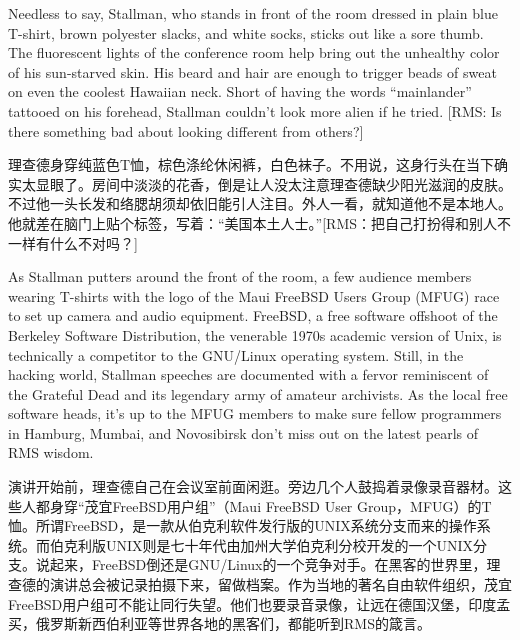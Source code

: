 \ifdefined\eng
Needless to say, Stallman, who stands in front of the room dressed in plain blue T-shirt, brown polyester slacks, and white socks, sticks out like a sore thumb. The fluorescent lights of the conference room help bring out the unhealthy color of his sun-starved skin.  His beard and hair are enough to trigger beads of sweat on even the coolest Hawaiian neck. Short of having the words ``mainlander'' tattooed on his forehead, Stallman couldn't look more alien if he tried. [RMS: Is there something bad about looking different from others?]
\fi

\ifdefined\chs
理查德身穿纯蓝色T恤，棕色涤纶休闲裤，白色袜子。不用说，这身行头在当下确实太显眼了。房间中淡淡的花香，倒是让人没太注意理查德缺少阳光滋润的皮肤。不过他一头长发和络腮胡须却依旧能引人注目。外人一看，就知道他不是本地人。他就差在脑门上贴个标签，写着：``美国本土人士。''[RMS：把自己打扮得和别人不一样有什么不对吗？]
\fi

\ifdefined\eng
As Stallman putters around the front of the room, a few audience members wearing T-shirts with the logo of the Maui FreeBSD Users Group (MFUG) race to set up camera and audio equipment. FreeBSD, a free software offshoot of the Berkeley Software Distribution, the venerable 1970s academic version of Unix, is technically a competitor to the GNU/Linux operating system. Still, in the hacking world, Stallman speeches are documented with a fervor reminiscent of the Grateful Dead and its legendary army of amateur archivists. As the local free software heads, it's up to the MFUG members to make sure fellow programmers in Hamburg, Mumbai, and Novosibirsk don't miss out on the latest pearls of RMS wisdom.
\fi

\ifdefined\chs
演讲开始前，理查德自己在会议室前面闲逛。旁边几个人鼓捣着录像录音器材。这些人都身穿``茂宜FreeBSD用户组''（Maui FreeBSD User Group，MFUG）的T恤。所谓FreeBSD，是一款从伯克利软件发行版的UNIX系统分支而来的操作系统。而伯克利版UNIX则是七十年代由加州大学伯克利分校开发的一个UNIX分支。说起来，FreeBSD倒还是GNU/Linux的一个竞争对手。在黑客的世界里，理查德的演讲总会被记录拍摄下来，留做档案。作为当地的著名自由软件组织，茂宜FreeBSD用户组可不能让同行失望。他们也要录音录像，让远在德国汉堡，印度孟买，俄罗斯新西伯利亚等世界各地的黑客们，都能听到RMS的箴言。
\fi


